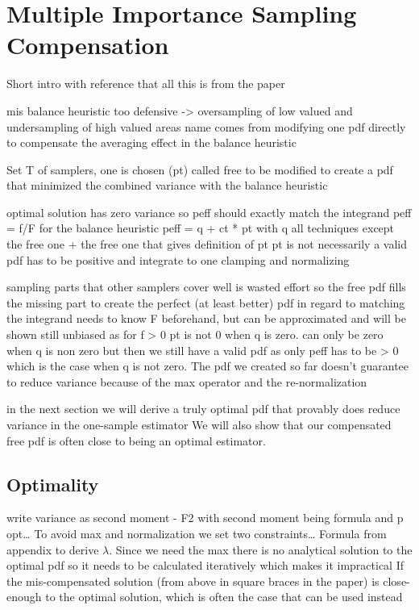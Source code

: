 \chapter{Multiple Importance Sampling Compensation}
\label{ch:mis_compensation}
Short intro with reference that all this is from the paper

mis balance heuristic too defensive -> oversampling of low valued and undersampling of high valued areas
name comes from modifying one pdf directly to compensate the averaging effect in the balance heuristic

Set T of samplers, one is chosen (pt) called free to be modified to create a pdf that minimized the combined variance with the balance heuristic

optimal solution has zero variance so peff should exactly match the integrand peff = f/F
for the balance heuristic peff = q + ct * pt with q all techniques except the free one + the free one
that gives definition of pt
pt is not necessarily a valid pdf has to be positive and integrate to one
clamping and normalizing

sampling parts that other samplers cover well is wasted effort so the free pdf fills the missing part to create the perfect (at least better) pdf in regard to matching the integrand
needs to know F beforehand, but can be approximated and will be shown
still unbiased as for f > 0 pt is not 0 when q is zero. can only be zero when q is non zero but then we still have a valid pdf as only peff has to be > 0 which is the case when q is not zero.
The pdf we created so far doesn't guarantee to reduce variance because of the max operator and the re-normalization

in the next section we will derive a truly optimal pdf that provably does reduce variance in the one-sample estimator
We will also show that our compensated free pdf is often close to being an optimal estimator.


\section{Optimality}
\label{sec:misc_optimality}
write variance as second moment - F2 with second moment being formula and p opt\dots
To avoid max and normalization we set two constraints\dots
Formula from appendix to derive $ \lambda $.
Since we need the max there is no analytical solution to the optimal pdf so it needs to be calculated iteratively which makes it impractical
If the mis-compensated solution (from above in square braces in the paper) is close-enough to the optimal solution, which is often the case that can be used instead

